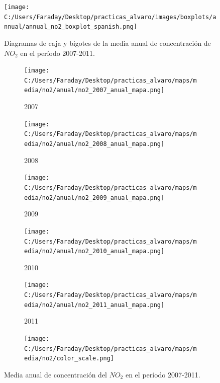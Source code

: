 \documentclass[12pt]{beamer}
\begin{document}
\begin{frame}[squeeze]
\begin{figure}[H]
\centering
\texttt{[image: C:/Users/Faraday/Desktop/practicas\_alvaro/images/boxplots/annual/annual\_no2\_boxplot\_spanish.png]}
\caption{\scriptsize Diagramas de caja y bigotes de la media anual de concentración de $NO_{2}$ en el período 2007-2011.}
\label{fig:box_no2_annual}
\end{figure}

\begin{figure}[H]

\centering
\begin{subfigure}[H]{0.18\textwidth}
\texttt{[image: C:/Users/Faraday/Desktop/practicas\_alvaro/maps/media/no2/anual/no2\_2007\_anual\_mapa.png]}
\captionsetup{labelformat=empty}
\caption{\scriptsize 2007}
\end{subfigure}
%
\begin{subfigure}[H]{0.18\textwidth}
\texttt{[image: C:/Users/Faraday/Desktop/practicas\_alvaro/maps/media/no2/anual/no2\_2008\_anual\_mapa.png]}
\captionsetup{labelformat=empty}
\caption{\scriptsize 2008}
\end{subfigure}
%
\begin{subfigure}[H]{0.18\textwidth}
\texttt{[image: C:/Users/Faraday/Desktop/practicas\_alvaro/maps/media/no2/anual/no2\_2009\_anual\_mapa.png]}
\captionsetup{labelformat=empty}
\caption{\scriptsize 2009}
\end{subfigure}
%
\begin{subfigure}[H]{0.18\textwidth}
\texttt{[image: C:/Users/Faraday/Desktop/practicas\_alvaro/maps/media/no2/anual/no2\_2010\_anual\_mapa.png]}
\captionsetup{labelformat=empty}
\caption{\scriptsize 2010}
\end{subfigure}
%
\begin{subfigure}[H]{0.18\textwidth}
\texttt{[image: C:/Users/Faraday/Desktop/practicas\_alvaro/maps/media/no2/anual/no2\_2011\_anual\_mapa.png]}
\captionsetup{labelformat=empty}
\caption{\scriptsize 2011}
\end{subfigure}

\begin{subfigure}[H]{0.45\textwidth}
\texttt{[image: C:/Users/Faraday/Desktop/practicas\_alvaro/maps/media/no2/color\_scale.png]}
\captionsetup{labelformat=empty}
\caption{}
\end{subfigure}

\vspace*{-7mm}
\caption{\scriptsize Media anual de concentración del $NO_{2}$ en el período 2007-2011.}
\label{fig:map-no2-anual}
\end{figure}
\end{frame}
\end{document}
